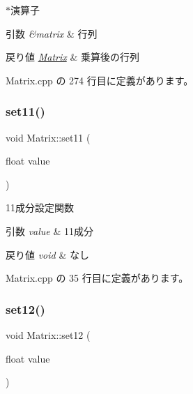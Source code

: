 $\ast$演算子 


\begin{DoxyParams}{引数}
{\em \&matrix} & 行列 \\
\hline
\end{DoxyParams}

\begin{DoxyRetVals}{戻り値}
{\em \mbox{\hyperlink{class_matrix}{Matrix}}} & 乗算後の行列 \\
\hline
\end{DoxyRetVals}


 Matrix.\+cpp の 274 行目に定義があります。

\mbox{\label{class_matrix_a702141355d7a4161432299224844b193}} 
\subsubsection{\texorpdfstring{set11()}{set11()}}
{\footnotesize\ttfamily void Matrix\+::set11 (\begin{DoxyParamCaption}\item[{float}]{value }\end{DoxyParamCaption})}



11成分設定関数 


\begin{DoxyParams}{引数}
{\em value} & 11成分 \\
\hline
\end{DoxyParams}

\begin{DoxyRetVals}{戻り値}
{\em void} & なし \\
\hline
\end{DoxyRetVals}


 Matrix.\+cpp の 35 行目に定義があります。

\mbox{\label{class_matrix_a16351455b43031ca0aaf27dceb3b65b4}} 
\subsubsection{\texorpdfstring{set12()}{set12()}}
{\footnotesize\ttfamily void Matrix\+::set12 (\begin{DoxyParamCaption}\item[{float}]{value }\end{DoxyParamCaption})}



